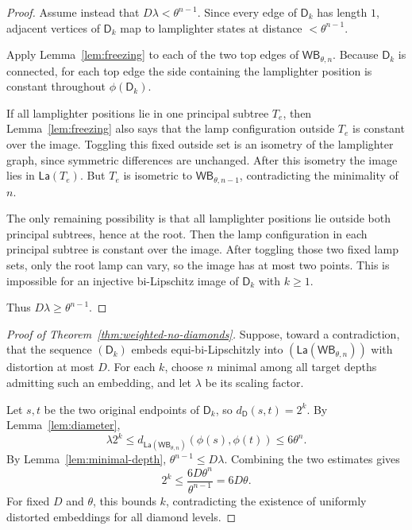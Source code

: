 \documentclass[11pt]{article}
\newcommand{\D}{\mathsf D}
\newcommand{\Lam}{\mathsf{La}}
\newcommand{\WB}{\mathsf{WB}}
\begin{document}
\begin{proof}
Assume instead that \(D\lambda<\theta^{n-1}\). Since every edge of \(\D_k\)
has length \(1\), adjacent vertices of \(\D_k\) map to lamplighter states at
distance \(<\theta^{n-1}\).

Apply Lemma~\ref{lem:freezing} to each of the two top edges of
\(\WB_{\theta,n}\). Because \(\D_k\) is connected, for each top edge the side
containing the lamplighter position is constant throughout \(\phi(\D_k)\).

If all lamplighter positions lie in one principal subtree \(T_e\), then
Lemma~\ref{lem:freezing} also says that the lamp configuration outside \(T_e\)
is constant over the image. Toggling this fixed outside set is an isometry of
the lamplighter graph, since symmetric differences are unchanged. After this
isometry the image lies in \(\Lam(T_e)\). But \(T_e\) is isometric to
\(\WB_{\theta,n-1}\), contradicting the minimality of \(n\).

The only remaining possibility is that all lamplighter positions lie outside
both principal subtrees, hence at the root. Then the lamp configuration in each
principal subtree is constant over the image. After toggling those two fixed
lamp sets, only the root lamp can vary, so the image has at most two points.
This is impossible for an injective bi-Lipschitz image of \(\D_k\) with
\(k\geq 1\).

Thus \(D\lambda\geq\theta^{n-1}\).
\end{proof}

\begin{proof}[Proof of Theorem~\ref{thm:weighted-no-diamonds}]
Suppose, toward a contradiction, that the sequence \((\D_k)\) embeds
equi-bi-Lipschitzly into \((\Lam(\WB_{\theta,n}))\) with distortion at most
\(D\). For each \(k\), choose \(n\) minimal among all target depths admitting
such an embedding, and let \(\lambda\) be its scaling factor.

Let \(s,t\) be the two original endpoints of \(\D_k\), so
\(d_{\D}(s,t)=2^k\). By Lemma~\ref{lem:diameter},
\[
  \lambda 2^k
  \leq d_{\Lam(\WB_{\theta,n})}(\phi(s),\phi(t))
  \leq 6\theta^n .
\]
By Lemma~\ref{lem:minimal-depth}, \(\theta^{n-1}\leq D\lambda\). Combining the
two estimates gives
\[
  2^k
  \leq
  \frac{6D\theta^n}{\theta^{n-1}}
  =
  6D\theta .
\]
For fixed \(D\) and \(\theta\), this bounds \(k\), contradicting the existence
of uniformly distorted embeddings for all diamond levels.
\end{proof}
\end{document}
